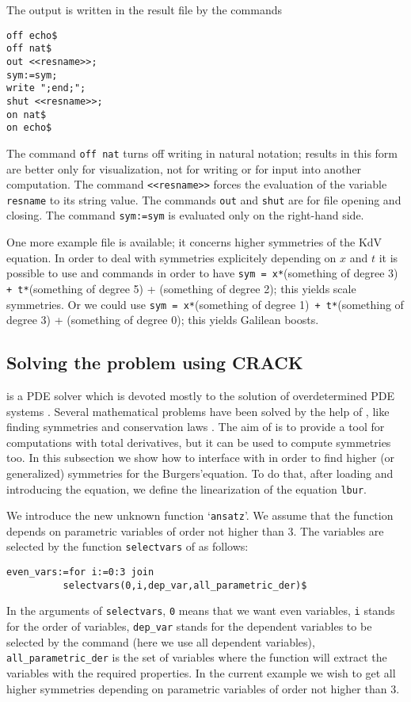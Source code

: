 The output is written in the result file by the commands
\begin{verbatim}
off echo$
off nat$
out <<resname>>;
sym:=sym;
write ";end;";
shut <<resname>>;
on nat$
on echo$
\end{verbatim}
The command \texttt{off nat} turns off writing in natural notation; results in
this form are better only for visualization, not for writing or for input into
another computation. The command \texttt{<<resname>>} forces the evaluation of
the variable \texttt{resname} to its string value. The commands \texttt{out}
and \texttt{shut} are for file opening and closing. The command
\texttt{sym:=sym} is evaluated only on the right-hand side.

One more example file is available; it concerns higher symmetries of the KdV
equation. In order to deal with symmetries explicitely depending on $x$ and
$t$ it is possible to use \REDUCE and \cde commands in order to have
\texttt{sym = x*}(something of degree 3)\texttt{ + t*}(something of degree  5)
+ (something of degree 2); this yields scale symmetries.
Or we could use \texttt{sym = x*}(something of degree 1)\texttt{ +
  t*}(something of degree 3) + (something of degree 0);
this yields Galilean boosts.

\subsection{Solving the problem using CRACK}

\crack is a PDE solver which is devoted mostly to the solution of
overdetermined PDE systems \cite{Brand:95,WolfBrand:CRACK}. Several mathematical problems
have been solved by the help of \crack, like finding symmetries
\cite{Wolf:APPLYSYM,Brand:92} and conservation laws \cite{Wolf:99d}. The aim of \cde is
to provide a tool for computations with total derivatives, but it can be used
to compute symmetries too. In this subsection we show how to interface \cde
with \crack in order to find higher (or generalized) symmetries for the
Burgers'equation. To do that, after loading \cde and introducing the equation,
we define the linearization of the equation \texttt{lbur}.

We introduce the new unknown function `\texttt{ansatz}'. We assume that the
function depends on parametric variables of order not higher than $3$.  The
variables are selected by the function \texttt{selectvars} of \cde as follows:
\begin{verbatim}
even_vars:=for i:=0:3 join
          selectvars(0,i,dep_var,all_parametric_der)$
\end{verbatim}
In the arguments of \texttt{selectvars}, \texttt{0} means that we want even
variables, \texttt{i} stands for the order of variables, \texttt{dep\_var}
stands for the dependent variables to be selected by the command (here we use
all dependent variables), \texttt{all\_parametric\_der} is the set of variables
where the function will extract the variables with the required properties.
In the current example we wish to get all higher symmetries depending on
parametric variables of order not higher than $3$.

